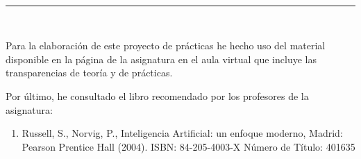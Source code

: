  \newpage
 \begin{center}
	{\fboxrule=4pt } \\
	\rule{15cm}{0pt} \\
\end{center}
\par Para la elaboración de este proyecto de prácticas he hecho uso del material disponible en la página de la asignatura en el aula virtual que incluye las transparencias de teoría y de prácticas.
\par Por último, he consultado el libro recomendado por los profesores de la asignatura:
\begin{enumerate}
	\item Russell, S., Norvig, P., Inteligencia Artificial: un enfoque moderno, Madrid: Pearson Prentice Hall (2004). ISBN: 84-205-4003-X
	Número de Título: 401635
\end{enumerate}

